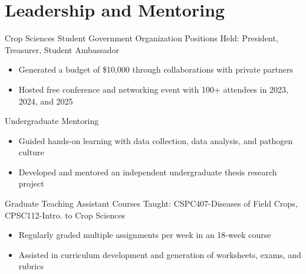 \section*{Leadership and Mentoring}

    {Crop Sciences Student Government Organization}
    {}
    {Positions Held: President, Treasurer, Student Ambassador}
\begin{itemize}
    \item Generated a budget of \$10,000 through collaborations with private partners
    \item Hosted free conference and networking event with 100+ attendees in 2023, 2024, and 2025
\end{itemize}

    {Undergraduate Mentoring}
    {}
    {}
\begin{itemize}
    \item Guided hands-on learning with data collection, data analysis, and pathogen culture
    \item Developed and mentored an independent undergraduate thesis research project
\end{itemize}

    {Graduate Teaching Assistant}
    {}
    {Courses Taught: CSPC407-Diseases of Field Crops, CPSC112-Intro. to Crop Sciences}
\begin{itemize}
    \item Regularly graded multiple assignments per week in an 18-week course
    \item Assisted in curriculum development and generation of worksheets, exams, and rubrics
\end{itemize}

\entry{}